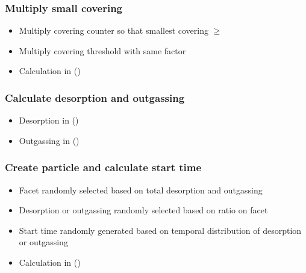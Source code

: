 \subsubsection{Multiply small covering}
\begin{itemize}[noitemsep,topsep=0pt, partopsep=0pt]
\item Multiply covering counter so that smallest covering $\geq$ 
\item Multiply covering threshold with same factor
\item Calculation in  ()
\end{itemize}

\subsubsection{Calculate desorption and outgassing}
\begin{itemize}[noitemsep,topsep=0pt, partopsep=0pt]
\item Desorption in   ()
\item Outgassing in  ()
\end{itemize}

\subsubsection{Create particle and calculate start time}
\begin{itemize}[noitemsep,topsep=0pt, partopsep=0pt]
\item Facet randomly selected based on total desorption and outgassing
\item Desorption or outgassing randomly selected based on ratio on facet
\item Start time randomly generated based on temporal distribution of desorption or outgassing
\item Calculation in   ()
\end{itemize}

